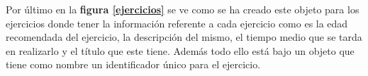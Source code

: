 Por último en la \textbf{figura \ref{ejercicios}} se ve
como se ha creado este objeto para los ejercicios donde tener la información
referente a cada ejercicio como es la edad recomendada del ejercicio,
la descripción del mismo, el tiempo medio que se tarda en realizarlo y el
título que este tiene. Además todo ello está bajo un objeto que tiene como
nombre un identificador único para el ejercicio.

